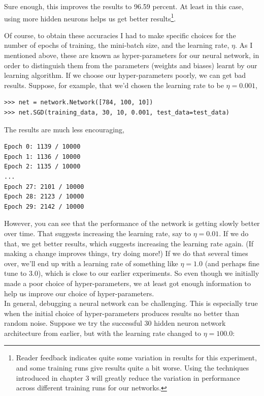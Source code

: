 Sure enough, this improves the results to 96.59 percent. At least in this case, using more hidden neurons helps us get better results\footnote{Reader feedback indicates quite some variation in results for this experiment, and some training runs give results quite a bit worse. Using the techniques introduced in chapter 3 will greatly reduce the variation in performance across different training runs for our networks.}.

Of course, to obtain these accuracies I had to make specific choices for the number of epochs of training, the mini-batch size, and the learning rate, $\eta$. As I mentioned above, these are known as hyper-parameters for our neural network, in order to distinguish them from the parameters (weights and biases) learnt by our learning algorithm. If we choose our hyper-parameters poorly, we can get bad results. Suppose, for example, that we'd chosen the learning rate to be $\eta=0.001$,

\begin{lstlisting}
>>> net = network.Network([784, 100, 10])
>>> net.SGD(training_data, 30, 10, 0.001, test_data=test_data)
\end{lstlisting}

The results are much less encouraging,

\begin{lstlisting}
Epoch 0: 1139 / 10000
Epoch 1: 1136 / 10000
Epoch 2: 1135 / 10000
...
Epoch 27: 2101 / 10000
Epoch 28: 2123 / 10000
Epoch 29: 2142 / 10000
\end{lstlisting}

However, you can see that the performance of the network is getting slowly better over time. That suggests increasing the learning rate, say to $\eta=0.01$. If we do that, we get better results, which suggests increasing the learning rate again. (If making a change improves things, try doing more!) If we do that several times over, we'll end up with a learning rate of something like $\eta=1.0$ (and perhaps fine tune to 3.0), which is close to our earlier experiments. So even though we initially made a poor choice of hyper-parameters, we at least got enough information to help us improve our choice of hyper-parameters.\\

In general, debugging a neural network can be challenging. This is especially true when the initial choice of hyper-parameters produces results no better than random noise. Suppose we try the successful 30 hidden neuron network architecture from earlier, but with the learning rate changed to $\eta=100.0$:

